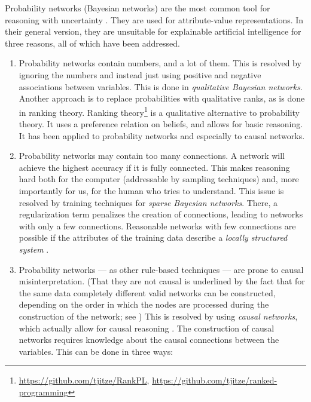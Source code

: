 Probability networks (Bayesian networks) are the most common tool for reasoning with uncertainty \citep[ch.~14.2]{russellArtificialIntelligenceModern2010}. They are used for attribute-value representations. In their general version, they are unsuitable for explainable artificial intelligence for three reasons, all of which have been addressed.

\begin{enumerate}
\item Probability networks contain numbers, and a lot of them. This is resolved by ignoring the numbers and instead just using positive and negative associations between variables. This is done in \textit{qualitative Bayesian networks}. Another approach is to replace probabilities with qualitative ranks, as is done in ranking theory. Ranking theory\footnote{\url{https://github.com/tjitze/RankPL}, \url{https://github.com/tjitze/ranked-programming}}\citep{spohnGeneralNonprobabilisticTheory1990,spohnLawsBeliefRanking2012} is a qualitative alternative to probability theory. It uses a preference relation on beliefs, and allows for basic reasoning. It has been applied to probability networks and especially to causal networks.
\item Probability networks may contain too many connections. A network will achieve the highest accuracy if it is fully connected. This makes reasoning hard both for the computer (addressable by sampling techniques) and, more importantly for us, for the human who tries to understand. This issue is resolved by training techniques for \textit{sparse Bayesian networks}. There, a regularization term penalizes the creation of connections, leading to networks with only a few connections. Reasonable networks with few connections are possible if the attributes of the training data describe a \textit{locally structured system} \cite[p.~516]{russellArtificialIntelligenceModern2010}.
\item Probability networks — as other rule-based techniques — are prone to causal misinterpretation. (That they are not causal is underlined by the fact that for the same data completely different valid networks can be constructed, depending on the order in which the nodes are processed during the construction of the network; see \citet[fig.~14.3]{russellArtificialIntelligenceModern2010}) This is resolved by using \textit{causal networks}, which actually allow for causal reasoning \citep{pearlCausalInferenceStatistics2016}. The construction of causal networks requires knowledge about the causal connections between the variables. This can be done in three ways: 

\end{enumerate}
